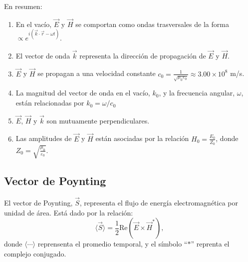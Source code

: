 \documentclass[letterpaper,10pt,english]{jupyterBook}
\let\sphinxpxdimen\pdfpxdimen\else\newdimen\sphinxpxdimen
\begin{document}
\sphinxAtStartPar
En resumen:
\begin{enumerate}
%
\item {} 
\sphinxAtStartPar
En el vacío, \(\vec{E}\) y \(\vec{H}\) se comportan como ondas trasversales de la forma \(\propto e^{ i\left(\vec{k}\cdot\vec{r} - \omega t\right)}\).

\item {} 
\sphinxAtStartPar
El vector de onda \(\vec{k}\) representa la dirección de propagación de \(\vec{E}\) y \(\vec{H}\).

\item {} 
\sphinxAtStartPar
\(\vec{E}\) y \(\vec{H}\) se propagan a una velocidad constante \(c_0 = \frac{1}{\sqrt{\mu_0\varepsilon_0}} \approx 3.00\times10^8\) m/s.

\item {} 
\sphinxAtStartPar
La magnitud del vector de onda en el vacío, \(k_0\), y la frecuencia angular, \(\omega\), están relacionadas por \(k_0 = \omega/c_0\)

\item {} 
\sphinxAtStartPar
\(\vec{E}\), \(\vec{H}\) y \(\vec{k}\) son mutuamente perpendiculares.

\item {} 
\sphinxAtStartPar
Las amplitudes de \(\vec{E}\) y \(\vec{H}\) están asociadas por la relación \({H}_0 = \frac{E_0}{Z_0}\), donde \(Z_0 = \sqrt{\frac{\mu_0}{\varepsilon_0}}\).

\end{enumerate}

\noindent{\hspace*{\fill}\sphinxincludegraphics[width=400\sphinxpxdimen]{{EM-Wave}.gif}\hspace*{\fill}}




\subsection{Vector de Poynting}
\label{\detokenize{1_ondas_electromagneticas/1_ondas_electromagneticas:vector-de-poynting}}
\sphinxAtStartPar
El vector de Poynting, \(\vec{S}\), representa el flujo de energía electromagnética por unidad de área. Está dado por la relación:
\label{equation:1_ondas_electromagneticas/1_ondas_electromagneticas:5ab5c704-f006-4252-8fb4-c5f1ed66d3ab}\begin{equation}
\langle\vec{S}\rangle = \frac{1}{2}\mathrm{Re}\left(\vec{E}\times\vec{H}^*\right),
\end{equation}
\sphinxAtStartPar
donde \(\langle\cdots\rangle\) reprensenta el promedio temporal, y el símbolo “\(*\)” reprenta el complejo conjugado.
\end{document}

